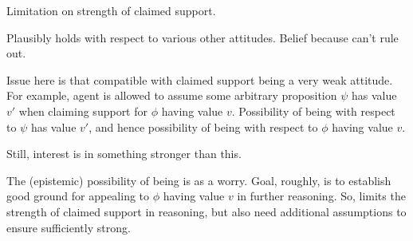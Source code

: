 \begin{note}
  Limitation on strength of claimed support.

  Plausibly holds with respect to various other attitudes.
  Belief because can't rule out.

  Issue here is that compatible with claimed support being a very weak attitude.
  For example, agent is allowed to assume some arbitrary proposition \(\psi\) has value \(v'\) when claiming support for \(\phi\) having value \(v\).
  Possibility of being \mistaken{} with respect to \(\psi\) has value \(v'\), and hence possibility of being \misled{} with respect to \(\phi\) having value \(v\).

  Still, interest is in something stronger than this.

  The (epistemic) possibility of being \mom{} is as a worry.
  Goal, roughly, is to establish good ground for appealing to \(\phi\) having value \(v\) in further reasoning.
  So, \nfcs{} limits the strength of claimed support in reasoning, but also need additional assumptions to ensure sufficiently strong.
\end{note}

